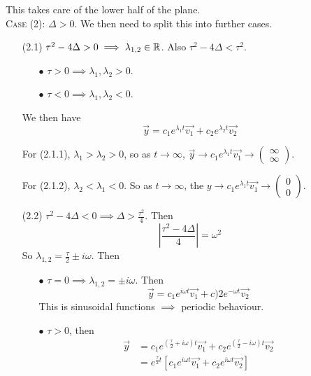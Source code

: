 \documentclass[10pt]{scrartcl}
\renewcommand{\l}{\lambda}
\begin{document}
This takes care of the lower half of the plane.\\



\textsc{Case (2):} $\Delta  >0$. We then need to split this into further cases. 

\begin{enumerate}
  \item[\textsc{(2.1)}] $\tau^2 - 4\Delta > 0 \implies \l_{1,2} \iR$. Also $\tau^2 - 4\Delta < \tau^2$.
  \begin{enumerate}
  \item[$\bullet$] $\tau > 0 \implies \l_1,\l_2 > 0$.
  \item[$\bullet$] $\tau < 0 \implies \l_1,\l_2 < 0$. 
\end{enumerate}
We then have 
\[
    \vec{y} = c_1e^{\l_1t}\vec{v_1} + c_2e^{\l_2t}\vec{v_2}
\]

For (2.1.1), $\l_1 > \l_2 > 0$, so as $ t \to \infty$, $\vec{y} \to c_1e^{\l_1t}\vec{v_1} \to \begin{pmatrix}
  \infty \\ \infty 
\end{pmatrix}
$. 

For (2.1.2), $\l_2< \l_1 < 0$. So as $t\to \infty$, the $y \to c_1e^{\l_1t}\vec{v_1} \to \begin{pmatrix}
  0 \\ 0
\end{pmatrix}
$.\\


\item[\textsc{(2.2)}] $\tau^2 - 4\Delta < 0 \implies \Delta > \frac{\tau^2}{4}$. Then 
\[
  \left|\frac{\tau^2-4\Delta}{4}\right| = \omega^2
\]
So $\l_{1,2} = \frac{\tau}{2} \pm i\omega$. Then 
\begin{enumerate}
  \item[$\bullet$] $\tau = 0 \implies \l_{1,2} = \pm i\omega$. Then 
  \[
  \vec{y} = c_1e^{i\omega t}\vec{v_1} + c)2e^{-\omega t}\vec{v_2}
\]
This is sinusoidal functions $\implies$ periodic behaviour.

\item[$\bullet$] $\tau > 0$, then 
\begin{align*}
  \vec{y} &= c_1e^{(\frac{\tau}{2} + i\omega)t}\vec{v_1} + c_2e^{(\frac{\tau}{2} -i\omega)t}\vec{v_2}\\
  &= e^{\frac{\tau}{2}t}\left[c_1e^{i\omega t}\vec{v_1} + c_2e^{i\omega t}\vec{v_2}\right]
\end{align*}


\end{enumerate}
\end{enumerate}
\end{document}
